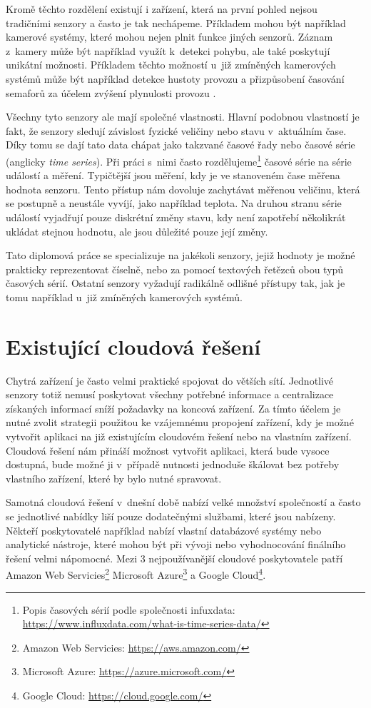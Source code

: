 Kromě těchto rozdělení existují i zařízení, která na první pohled nejsou tradičními senzory a často je tak nechápeme. Příkladem mohou být například kamerové systémy, které mohou nejen plnit funkce jiných senzorů. Záznam z~kamery může být například využít k~detekci pohybu, ale také poskytují unikátní možnosti. Příkladem těchto možností u~již zmíněných kamerových systémů může být například detekce hustoty provozu a přizpůsobení časování semaforů za účelem zvýšení plynulosti provozu \cite{7307377}.

Všechny tyto senzory ale mají společné vlastnosti. Hlavní podobnou vlastností je fakt, že senzory sledují závislost fyzické veličiny nebo stavu v~aktuálním čase. Díky tomu se dají tato data chápat jako takzvané časové řady nebo časové série (anglicky \textit{time series}). Při práci s~nimi často rozdělujeme\footnote{Popis časových sérií podle společnosti infuxdata: \url{https://www.influxdata.com/what-is-time-series-data/}} časové série na série událostí a měření. Typičtější jsou měření, kdy je ve stanoveném čase měřena hodnota senzoru. Tento přístup nám dovoluje zachytávat měřenou veličinu, která se postupně a neustále vyvíjí, jako například teplota. Na druhou stranu série událostí vyjadřují pouze diskrétní změny stavu, kdy není zapotřebí několikrát ukládat stejnou hodnotu, ale jsou důležité pouze její změny.

Tato diplomová práce se specializuje na jakékoli senzory, jejiž hodnoty je možné prakticky reprezentovat číselně, nebo za pomocí textových řetězců obou typů časových sérií. Ostatní senzory vyžadují radikálně odlišné přístupy tak, jak je tomu například u~již zmíněných kamerových systémů.

\section{Existující cloudová řešení} %
Chytrá zařízení je často velmi praktické spojovat do větších sítí. Jednotlivé senzory totiž nemusí poskytovat všechny potřebné informace a centralizace získaných informací sníží požadavky na koncová zařízení. Za tímto účelem je nutné zvolit strategii použitou ke vzájemnému propojení zařízení, kdy je možné vytvořit aplikaci na již existujícím cloudovém řešení nebo na vlastním zařízení. Cloudová řešení nám přináší možnost vytvořit aplikaci, která bude vysoce dostupná, bude možné ji v~případě nutnosti jednoduše škálovat bez potřeby vlastního zařízení, které by bylo nutné spravovat. 

Samotná cloudová řešení v~dnešní době nabízí velké množství společností a často se jednotlivé nabídky liší pouze dodatečnými službami, které jsou nabízeny. Někteří poskytovatelé například nabízí vlastní databázové systémy nebo analytické nástroje, které mohou být při vývoji nebo vyhodnocování finálního řešení velmi nápomocné. Mezi 3 nejpoužívanější \cite{gartner_2021} cloudové poskytovatele patří Amazon Web Servicies\footnote{Amazon Web Servicies: \url{https://aws.amazon.com/}} Microsoft Azure\footnote{Microsoft Azure: \url{https://azure.microsoft.com/}} a Google Cloud\footnote{Google Cloud: \url{https://cloud.google.com/}}.

